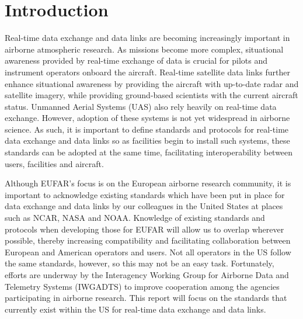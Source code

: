 \section{Introduction}\label{intro}


Real-time data exchange and data links are becoming increasingly important in airborne atmospheric research.  As missions become more complex, situational awareness provided by real-time exchange of data is crucial for pilots and instrument operators onboard the aircraft.  Real-time satellite data links further enhance situational awareness by providing the aircraft with up-to-date radar and satellite imagery, while providing ground-based scientists with the current aircraft status.  Unmanned Aerial Systems (UAS) also rely heavily on real-time data exchange.  However, adoption of these systems is not yet widespread in airborne science.  As such, it is important to define standards and protocols for real-time data exchange and data links so as facilities begin to install such systems, these standards can be adopted at the same time, facilitating interoperability between users, facilities and aircraft.  

Although EUFAR's focus is on the European airborne research community, it is important to acknowledge existing standards which have been put in place for data exchange and data links by our colleagues in the United States at places such as NCAR, NASA and NOAA.  Knowledge of existing standards and protocols when developing those for EUFAR will allow us to overlap wherever possible, thereby increasing compatibility and facilitating collaboration between European and American operators and users.  Not all operators in the US follow the same standards, however, so this may not be an easy task.  Fortunately, efforts are underway by the Interagency Working Group for Airborne Data and Telemetry Systems (IWGADTS) to improve cooperation among the agencies participating in airborne research.  This report will focus on the standards that currently exist within the US for real-time data exchange and data links.  










